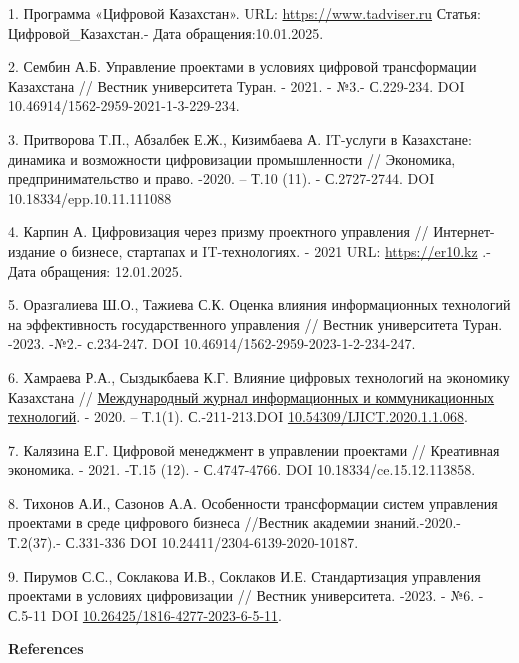 \begin{references}
1. Программа «Цифровой Казахстан». URL: \href{https://www.tadviser.ru/index.php/}{https://www.tadviser.ru} Статья:
Цифровой\_Казахстан.- Дата обращения:10.01.2025.

2. Сембин А.Б. Управление проектами в условиях цифровой трансформации
Казахстана // Вестник университета Туран. - 2021. - №3.- С.229-234. DOI
10.46914/1562-2959-2021-1-3-229-234.

3. Притворова Т.П., Абзалбек Е.Ж., Кизимбаева А. IT-услуги в Казахстане:
динамика и возможности цифровизации промышленности // Экономика,
предпринимательство и право. -2020. -- Т.10 (11). - С.2727-2744. DOI
10.18334/epp.10.11.111088

4. Карпин А. Цифровизация через призму проектного управления //
Интернет-издание о бизнесе, стартапах и IT-технологиях. - 2021 URL:
\href{https://er10.kz/read/analitika/cifrovizaciya-cherez-prizmu-proektnogo-upravleniya/}{https://er10.kz} .-Дата
обращения: 12.01.2025.

5. Оразгалиева Ш.О., Тажиева С.К. Оценка влияния информационных
технологий на эффективность государственного управления // Вестник
университета Туран. -2023. -№2.- с.234-247. DOI
10.46914/1562-2959-2023-1-2-234-247.

6. Хамраева Р.А., Сыздыкбаева К.Г. Влияние цифровых технологий на
экономику Казахстана //
\href{https://journal.iitu.edu.kz/index.php/ijict/issue/view/1}{Международный
журнал информационных и коммуникационных технологий}. - 2020. -- Т.1(1).
С.-211-213.DOI
\href{https://doi.org/10.54309/IJICT.2020.1.1.068}{10.54309/IJICT.2020.1.1.068}.

7. Калязина Е.Г. Цифровой менеджмент в управлении проектами // Креативная
экономика. - 2021. -Т.15 (12). - С.4747-4766. DOI
10.18334/ce.15.12.113858.

8. Тихонов А.И., Сазонов А.А. Особенности трансформации систем управления
проектами в среде цифрового бизнеса //Вестник академии
знаний.-2020.-Т.2(37).- С.331-336 DOI 10.24411/2304-6139-2020-10187.

9. Пирумов С.С., Соклакова И.В., Соклаков И.Е. Стандартизация управления
проектами в условиях цифровизации // Вестник университета. -2023. - №6.
- С.5-11 DOI
\href{https://doi.org/10.26425/1816-4277-2023-6-5-11}{10.26425/1816-4277-2023-6-5-11}.
\end{references}

\begin{center}
{\bfseries References}
\end{center}

